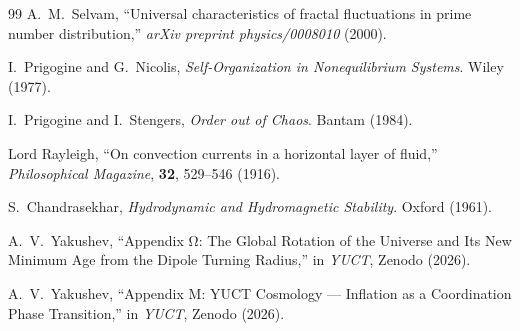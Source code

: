 \documentclass[11pt,a4paper]{article}
\begin{document}
\begin{thebibliography}{99}
		A.~M.~Selvam, ``Universal characteristics of fractal fluctuations in prime number distribution,'' \emph{arXiv preprint physics/0008010} (2000).
		
		I.~Prigogine and G.~Nicolis, \emph{Self-Organization in Nonequilibrium Systems}. Wiley (1977).
		
		I.~Prigogine and I.~Stengers, \emph{Order out of Chaos}. Bantam (1984).
		
		Lord Rayleigh, ``On convection currents in a horizontal layer of fluid,'' \emph{Philosophical Magazine}, \textbf{32}, 529--546 (1916).
		
		S.~Chandrasekhar, \emph{Hydrodynamic and Hydromagnetic Stability}. Oxford (1961).
		
		A.~V.~Yakushev, ``Appendix Ω: The Global Rotation of the Universe and Its New Minimum Age from the Dipole Turning Radius,'' in \emph{YUCT}, Zenodo (2026).
		
		A.~V.~Yakushev, ``Appendix M: YUCT Cosmology — Inflation as a Coordination Phase Transition,'' in \emph{YUCT}, Zenodo (2026).
		
	\end{thebibliography}
	
\end{document}
